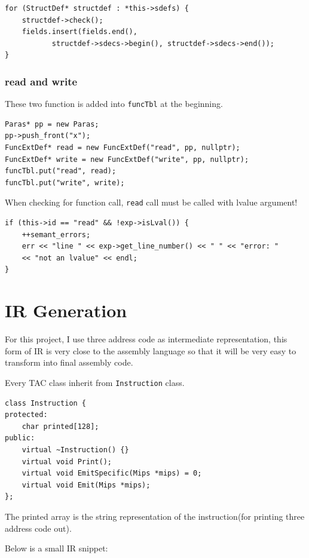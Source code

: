 \documentclass[11pt]{article}
\begin{document}
\begin{verbatim}
for (StructDef* structdef : *this->sdefs) {
    structdef->check();
    fields.insert(fields.end(), 
           structdef->sdecs->begin(), structdef->sdecs->end());
}
\end{verbatim}
\subsubsection{read and write}
\label{sec:orgheadline16}
These two function is added into \texttt{funcTbl} at the beginning.

\begin{verbatim}
Paras* pp = new Paras;
pp->push_front("x");
FuncExtDef* read = new FuncExtDef("read", pp, nullptr);
FuncExtDef* write = new FuncExtDef("write", pp, nullptr);
funcTbl.put("read", read);
funcTbl.put("write", write);
\end{verbatim}

When checking for function call, \texttt{read} call must be called with lvalue
argument!

\begin{verbatim}
if (this->id == "read" && !exp->isLval()) {
    ++semant_errors;
    err << "line " << exp->get_line_number() << " " << "error: "
    << "not an lvalue" << endl;
}
\end{verbatim}
\section{IR Generation}
\label{sec:orgheadline27}
For this project, I use three address code as intermediate representation,
this form of IR is very close to the assembly language so that it will be very
easy to transform into final assembly code.

Every TAC class inherit from \texttt{Instruction} class.
\begin{verbatim}
class Instruction {
protected:
    char printed[128];
public:
    virtual ~Instruction() {}
    virtual void Print();
    virtual void EmitSpecific(Mips *mips) = 0;
    virtual void Emit(Mips *mips);
};
\end{verbatim}
The printed array is the string representation of the instruction(for printing
three address code out).

Below is a small IR snippet:
\end{document}
